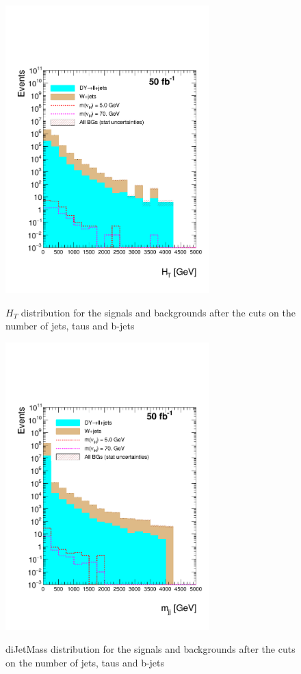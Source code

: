  \begin{figure}[h] 
 \centering
 \caption{$H_T$ distribution for the signals and backgrounds after the cuts on the number of jets, taus and b-jets}
 \includegraphics[width=0.7\textwidth]{./Capitulos/Analysis/AfterBJets/HT_MET_20} 
 \label{HT_bjets}
 \end{figure} 
 
  \begin{figure}[h] 
 \centering
 \caption{diJetMass distribution for the signals and backgrounds after the cuts on the number of jets, taus and b-jets}
 \includegraphics[width=0.7\textwidth]{./Capitulos/Analysis/AfterBJets/mjj_MET_20} 
 \label{diJetMass_bjets}
 \end{figure} 
 
